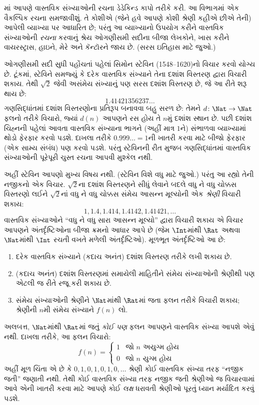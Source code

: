 \documentclass[../../../include/open-logic-section]{subfiles}
\begin{document}


માં આપણે વાસ્તવિક સંખ્યાઓની રચના ડેડેકિન્ડ કાપો
તરીકે કરી. આ વિભાગમાં એક વૈકલ્પિક રચના સમજાવીશું. તે કોશીએ
(જેને હવે આપણે કોશી શ્રેણી કહીએ છીએ તેની) આપેલી વ્યાખ્યા પર આધારિત
છે; પરંતુ આ વ્યાખ્યાનો ઉપયોગ કરીને વાસ્તવિક સંખ્યાઓની \emph{રચના}
કરવાનું શ્રેય ઓગણીસમી સદીના બીજા લેખકોને, ખાસ કરીને વાયરસ્ટ્રાસ,
હાઇને, મેરે અને કૅન્ટૉરને જાય છે. (સરસ ઇતિહાસ માટે
\citeauthor{OConnorRobertson:RN} \citeyear{OConnorRobertson:RN} જુઓ.)

ઓગણીસમી સદી સુધી પહોંચતાં પહેલાં સિમોન સ્ટેવિન (1548--1620)નો વિચાર
કરવો યોગ્ય છે. ટૂંકમાં, સ્ટેવિને સમજ્યું કે દરેક વાસ્તવિક સંખ્યાને
તેના દશાંશ વિસ્તરણ દ્વારા વિચારી શકાય. તેથી $\sqrt{2}$ જેવી અસંમેય
સંખ્યાનું પણ સરસ દશાંશ વિસ્તરણ છે, જે આ રીતે શરૂ થાય છે:
\[
	1.41421356237\ldots
\]
ગણસિદ્ધાંતમાં દશાંશ વિસ્તરણોના પ્રતિરૂપ બનાવવા બહુ સરળ છે: તેમને
$d \colon \Nat \to \Nat$ ફલનો તરીકે વિચારો, જ્યાં $d(n)$ આપણને
રસ હોય તે $n$મું દશાંશ સ્થાન છે. પછી દશાંશ ચિહ્નની પહેલાં આવતા
વાસ્તવિક સંખ્યાના ભાગને (અહીં માત્ર $1$ને) સંભાળવા વ્યાખ્યામાં થોડો
ફેરફાર કરવો પડશે. દાખલા તરીકે $0.999\ldots = 1$ની ખાતરી કરવા માટે
બીજો ફેરફાર (એક સામ્ય સંબંધ) પણ કરવો પડશે. પરંતુ સ્ટેવિનની રીત મુજબ
ગણસિદ્ધાંતમાં વાસ્તવિક સંખ્યાઓની પૂરેપૂરી ચુસ્ત રચના આપવી મુશ્કેલ નથી.

અહીં સ્ટેવિન આપણો મુખ્ય વિષય નથી. (સ્ટેવિન વિશે વધુ માટે
\citealt{KatzKatz2012} જુઓ.) પરંતુ આ રહ્યો તેની નજીકનો એક વિચાર.
$\sqrt{2}$ના દશાંશ વિસ્તરણને સીધું લેવાને બદલે વધુ ને વધુ ચોક્કસ
વિસ્તરણો લઈને $\sqrt{2}$નાં વધુ ને વધુ ચોક્કસ સંમેય આસન્ન મૂલ્યોની
એક \emph{શ્રેણી} વિચારી શકાય:
\[
1, 1.4, 1.414, 1.4142, 1.41421,\ldots
\]
વાસ્તવિક સંખ્યાઓને ``વધુ ને વધુ સારા આસન્ન મૂલ્યો'' દ્વારા વિચારી
શકાય એ વિચાર આપણને અંતર્દૃષ્ટિઓના બીજા ક્રમનો આધાર આપે છે (જેમ
$\Int$માંથી $\Rat$ અથવા $\Nat$માંથી $\Int$ રચતી વખતે મળેલી
અંતર્દૃષ્ટિઓ). મૂળભૂત અંતર્દૃષ્ટિઓ આ છે:
\begin{enumerate}
	\item દરેક વાસ્તવિક સંખ્યાને (કદાચ અનંત) દશાંશ વિસ્તરણ તરીકે લખી
	શકાય છે.
	\item (કદાચ અનંત) દશાંશ વિસ્તરણમાં સમાયેલી માહિતીને સંમેય સંખ્યાઓની
	શ્રેણીથી પણ એટલી જ રીતે રજૂ કરી શકાય છે.
	\item સંમેય સંખ્યાઓની શ્રેણીને $\Nat$માંથી $\Rat$માં જતા ફલન
	તરીકે વિચારી શકાય; શ્રેણીની $n$મી સંમેય સંખ્યાને $f(n)$ લો.
\end{enumerate}
અલબત્ત, $\Nat$માંથી $\Rat$માં જતું \emph{કોઈ પણ} ફલન આપણને વાસ્તવિક
સંખ્યા આપશે એવું નથી. દાખલા તરીકે, આ ફલન વિચારો:
\[
	f(n) =\begin{cases}
			1 & \text{જો }n\text{ અયુગ્મ હોય}\\
			0 &\text{જો }n\text{ યુગ્મ હોય}
		\end{cases}
\]
અહીં મૂળ ચિંતા એ છે કે $0,1,0,1,0,1,0,\ldots$ શ્રેણી કોઈ વાસ્તવિક
સંખ્યા તરફ ``નજીક જતી'' જણાતી નથી. તેથી કોઈ વાસ્તવિક સંખ્યા તરફ
નજીક જતી શ્રેણીઓ જ વિચારવામાં આવે એની ખાતરી કરવા માટે આપણે કોઈ
\emph{લક્ષ} ધરાવતી શ્રેણીઓ પૂરતું ધ્યાન મર્યાદિત કરવું પડશે.
\end{document}
